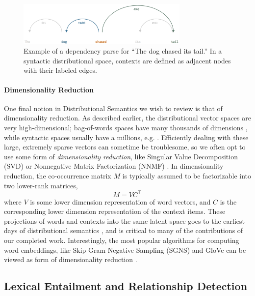 \documentclass[12pt]{article}
\begin{document}
\begin{figure}
  \centering
  \includegraphics[width=0.75\textwidth]{figures/syn}
\caption{Example of a dependency parse for ``The dog chased its tail.'' In
a syntactic distributional space, contexts are defined as adjacent nodes
with their labeled edges.}
\label{fig:syn}
\end{figure}

\paragraph{Dimensionality Reduction}
One final notion in Distributional Semantics we wish to review is that of
dimensionality reduction. As described earlier, the distributional vector
spaces are very high-dimensional; bag-of-words spaces have many thousands of
dimensions \cite{turney:2010:jair,mikolov:2013:iclr,pennington:2014:emnlp},
while syntactic spaces usually have a millions, e.g. .
Efficiently dealing with these large, extremely sparse vectors can sometime be
troublesome, so we often opt to use some form of {\em dimensionality
reduction}, like Singular Value Decomposition (SVD)
\cite{deerwester:1990:jsis,landauer:1997:pr} or Nonnegative Matrix
Factorization (NNMF) \cite{lee:2000:nips}. In dimensionality reduction, the
co-occurrence matrix $M$ is typically assumed to be factorizable into two
lower-rank matrices,
\begin{equation}
  M = VC^{\top}
  \label{eqn:svd}
\end{equation}
where $V$ is some lower dimension representation of word vectors, and $C$ is
the corresponding lower dimension representation of the context items. These
projections of words and contexts into the same latent space goes to the
earliest days of distributional semantics \cite{deerwester:1990:jsis}, and is
critical to many of the contributions of our completed work.  Interestingly,
the most popular algorithms for computing word embeddings, like Skip-Gram
Negative Sampling (SGNS) \cite{mikolov:2013:iclr} and GloVe
\cite{pennington:2014:emnlp} can be viewed as form of dimensionality reduction
\cite{levy:2014:nips,levy:2015:tacl}.

\subsection{Lexical Entailment and Relationship Detection}
\end{document}
